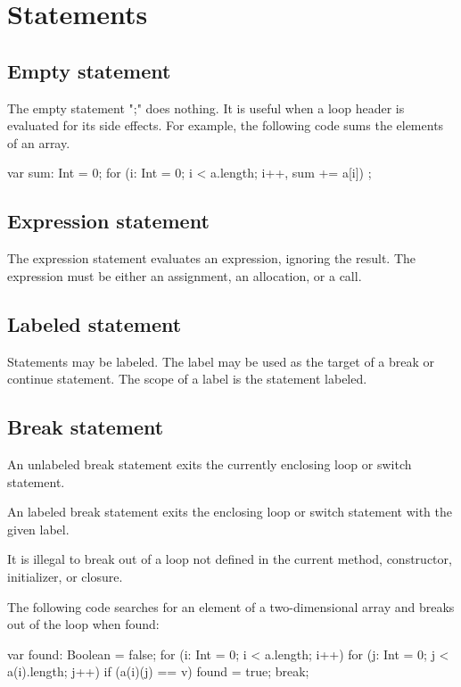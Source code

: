 \chapter{Statements}\label{XtenStatements}

\section{Empty statement}

The empty statement \xcd";" does nothing.  It is useful when a
loop header is evaluated for its side effects.  For example,
the following code sums the elements of an array.
\begin{xten}
var sum: Int = 0;
for (i: Int = 0; i < a.length; i++, sum += a[i])
    ;
\end{xten}

\section{Expression statement}

The expression statement evaluates an expression, ignoring the
result.  The expression must be either an assignment, an
allocation, or a call.

\section{Labeled statement}

Statements may be labeled.  The label may be used as the target
of a break or continue statement.  The scope of a label is the
statement labeled.

\section{Break statement}

An unlabeled break statement exits the currently enclosing loop
or switch statement.

An labeled break statement exits the enclosing loop
or switch statement with the given label.

It is illegal to break out of a loop not defined in the current
method, constructor, initializer, or closure.

The following code searches for an element of a two-dimensional
array and breaks out of the loop when found:

\begin{xten}
var found: Boolean = false;
for (i: Int = 0; i < a.length; i++)
    for (j: Int = 0; j < a(i).length; j++)
        if (a(i)(j) == v) {
            found = true;
            break;
        }
\end{xten}

